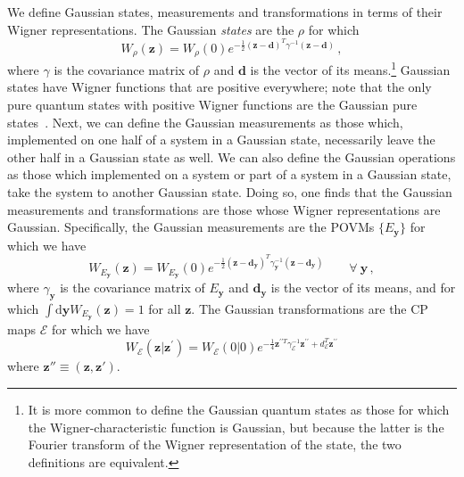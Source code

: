 \documentclass[pra,superscriptaddress,nofootinbib,12pt]{revtex4-2}
\begin{document}
We define Gaussian states, measurements and transformations in terms of their Wigner representations. The Gaussian \emph{states} are the $\rho$ for which
\begin{equation}
  W_{\rho}(\mathbf{z})=W_{\rho}(0)e^{-\frac{1}{2}(\mathbf{z}-
  \mathbf{d})^{T}\gamma ^{-1}(\mathbf{z}-\mathbf{d})}\,,
\end{equation}
where $\gamma$ is the covariance matrix of $\rho$ and $\mathbf{d}$ is the vector of its means.\footnote{It is more common to define the Gaussian quantum states as those for which the Wigner-characteristic function is Gaussian, but because the latter is the Fourier transform of the Wigner representation of the state, the two definitions are equivalent.}  Gaussian states have Wigner functions that are positive everywhere; note that the only pure quantum states with positive Wigner functions are the Gaussian pure states~\cite{Hud74}.  Next, we can define the Gaussian measurements as those which, implemented on one half of a
system in a Gaussian state, necessarily leave the other half in a Gaussian state as well.  We can also define the Gaussian operations as those which implemented on a system or part of a system in a Gaussian state, take the system to another Gaussian state.  Doing so, one finds that the Gaussian measurements and transformations are those whose Wigner representations are Gaussian.  Specifically, the Gaussian measurements are the POVMs $\{E_{\mathbf{y}}\}$ for which we have
\begin{equation}
  W_{E_{\mathbf{y}}}(\mathbf{z})=W_{E_{\mathbf{y}}}(0)e^{-\frac{1}{2}(\mathbf{z}-\mathbf{d}_{\mathbf{y}})^{T}\gamma _{\mathbf{y}}^{-1}(\mathbf{z}-\mathbf{d}_{\mathbf{y}})}\qquad \forall\ \mathbf{y}\,,
\end{equation}
where $\gamma _{\mathbf{y}}$ is the covariance matrix of $E_{\mathbf{y}}$ and $\mathbf{d}_{\mathbf{y}}$ is the vector of its means, and for which $\int \mathrm{d}\mathbf{y} W_{E_{\mathbf{y}}}(\mathbf{z}) =1$ for all $\mathbf{z}$.
The Gaussian transformations are the CP maps $\mathcal{E}$ for which we have
\begin{equation}
  W_{\mathcal{E}}(\mathbf{z}|\mathbf{z}^{\prime })=W_{\mathcal{E}}(0|0)e^{-\frac{1}{4}\mathbf{z}^{\prime \prime T}\gamma _{\mathcal{E}}^{-1}\mathbf{z}^{\prime \prime }+d_{\mathcal{E}}^{T}\mathbf{z}^{\prime \prime }}
\end{equation}
where $\mathbf{z}'' \equiv (\mathbf{z},\mathbf{z}')$.

\end{document}
